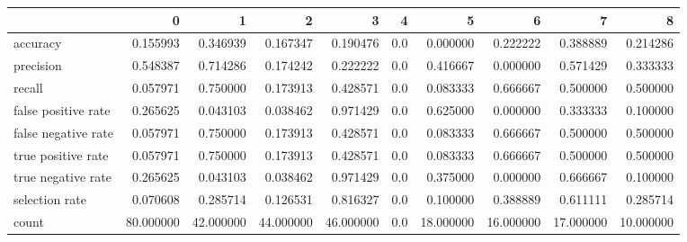 \begin{tabular}{lrrrrrrrrr}
\toprule
{} &          0 &          1 &          2 &          3 &    4 &          5 &          6 &          7 &          8 \\
\midrule
accuracy            &   0.155993 &   0.346939 &   0.167347 &   0.190476 &  0.0 &   0.000000 &   0.222222 &   0.388889 &   0.214286 \\
precision           &   0.548387 &   0.714286 &   0.174242 &   0.222222 &  0.0 &   0.416667 &   0.000000 &   0.571429 &   0.333333 \\
recall              &   0.057971 &   0.750000 &   0.173913 &   0.428571 &  0.0 &   0.083333 &   0.666667 &   0.500000 &   0.500000 \\
false positive rate &   0.265625 &   0.043103 &   0.038462 &   0.971429 &  0.0 &   0.625000 &   0.000000 &   0.333333 &   0.100000 \\
false negative rate &   0.057971 &   0.750000 &   0.173913 &   0.428571 &  0.0 &   0.083333 &   0.666667 &   0.500000 &   0.500000 \\
true positive rate  &   0.057971 &   0.750000 &   0.173913 &   0.428571 &  0.0 &   0.083333 &   0.666667 &   0.500000 &   0.500000 \\
true negative rate  &   0.265625 &   0.043103 &   0.038462 &   0.971429 &  0.0 &   0.375000 &   0.000000 &   0.666667 &   0.100000 \\
selection rate      &   0.070608 &   0.285714 &   0.126531 &   0.816327 &  0.0 &   0.100000 &   0.388889 &   0.611111 &   0.285714 \\
count               &  80.000000 &  42.000000 &  44.000000 &  46.000000 &  0.0 &  18.000000 &  16.000000 &  17.000000 &  10.000000 \\
\bottomrule
\end{tabular}
